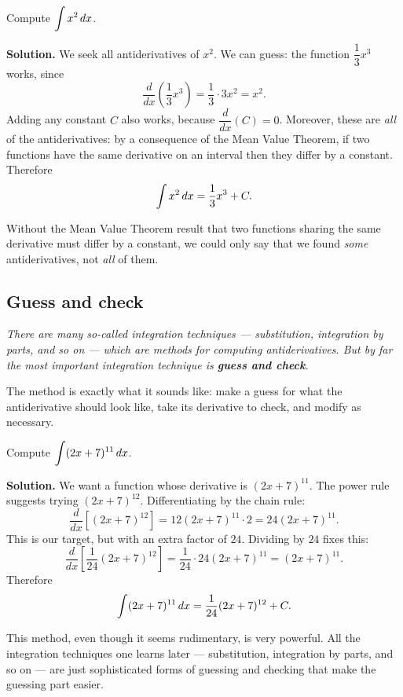\begin{example}
\label{ex:8-1}
Compute $\displaystyle\int x^{2}\,dx$.

\textbf{Solution.}  We seek all antiderivatives of $x^{2}$.  We can guess: the function $\dfrac{1}{3}x^{3}$ works, since
\[
  \frac{d}{dx}\!\left(\frac{1}{3}x^{3}\right) = \frac{1}{3}\cdot 3x^{2} = x^{2}.
\]
Adding any constant $C$ also works, because $\dfrac{d}{dx}(C) = 0$.  Moreover, these are \textit{all} of the antiderivatives: by a consequence of the Mean Value Theorem, if two functions have the same derivative on an interval then they differ by a constant.  Therefore
\[
  \int x^{2}\,dx = \frac{1}{3}x^{3} + C.
\]
\end{example}

\begin{remark}
Without the Mean Value Theorem result that two functions sharing the same derivative must differ by a constant, we could only say that we found \textit{some} antiderivatives, not \textit{all} of them.
\end{remark}

\subsection*{Guess and check}

\textit{There are many so-called integration techniques --- substitution, integration by parts, and so on --- which are methods for computing antiderivatives.  But by far the most important integration technique is \textbf{guess and check}.}

The method is exactly what it sounds like: make a guess for what the antiderivative should look like, take its derivative to check, and modify as necessary.

\begin{example}
\label{ex:8-2}
Compute $\displaystyle\int (2x+7)^{11}\,dx$.

\textbf{Solution.}  We want a function whose derivative is $(2x+7)^{11}$.  The power rule suggests trying $(2x+7)^{12}$.  Differentiating by the chain rule:
\[
  \frac{d}{dx}\!\left[(2x+7)^{12}\right] = 12(2x+7)^{11}\cdot 2 = 24(2x+7)^{11}.
\]
This is our target, but with an extra factor of $24$.  Dividing by $24$ fixes this:
\[
  \frac{d}{dx}\!\left[\frac{1}{24}(2x+7)^{12}\right] = \frac{1}{24}\cdot 24(2x+7)^{11} = (2x+7)^{11}.
\]
Therefore
\[
  \int (2x+7)^{11}\,dx = \frac{1}{24}(2x+7)^{12} + C.
\]
\end{example}

\begin{remark}
This method, even though it seems rudimentary, is very powerful.  All the integration techniques one learns later --- substitution, integration by parts, and so on --- are just sophisticated forms of guessing and checking that make the guessing part easier.
\end{remark}

